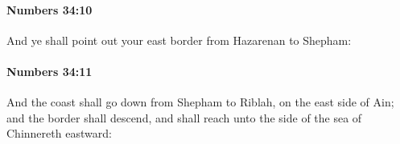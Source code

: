 		\paragraph{Numbers 34:10} %
			\label{NUMBERS-34-10}

			And ye shall point out your east border from Hazarenan to Shepham:


		\paragraph{Numbers 34:11} %
			\label{NUMBERS-34-11}

			And the coast shall go down from Shepham to Riblah, on the east side of Ain; and the border shall descend, and shall reach unto the side of the sea of Chinnereth eastward:


